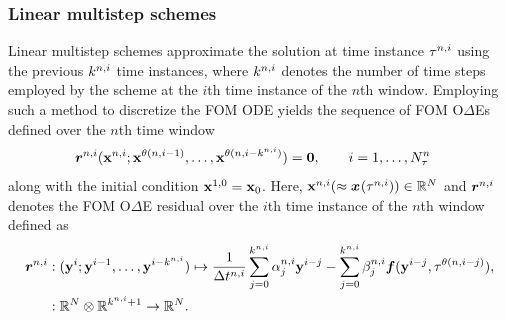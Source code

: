 \subsubsection{Linear multistep schemes}
Linear multistep schemes approximate the solution at time instance $\tau^{n,i}$ using the previous $k^{n,i}$ time instances, where $k^{n,i}$ denotes the number of time steps employed by the scheme at the $i$th time instance of the $n$th window. 
Employing such a method to discretize the FOM ODE yields the sequence of FOM
O$\Delta$Es defined over the $n$th time window
\begin{align*}
&\boldsymbol r_{}^{n,i} ({\mathbf{x}}^{n,i};{\mathbf{x}}^{\theta(n,i-1)},\ldots,{\mathbf{x}}^{\theta(n,i-k^{n,i})}) = \boldsymbol 0, \qquad i=1,\ldots,N_{\tau}^{n}
\end{align*}
along with the initial condition ${\mathbf{x}}^{1,0} = {{\mathbf{x}}_0}$.
Here, ${\mathbf{x}}^{n,i} (\approx
{\boldsymbol x}^{}(\tau^{n,i}))
\in \mathbb{R}^{N}$ and $\boldsymbol r_{}^{n,i}$ denotes the FOM O$\Delta$E
residual over the $i$th time instance of the $n$th window  
defined as
\begin{align*}
\boldsymbol r_{}^{n,i} &: (\mathbf{y}^{i};\mathbf{y}^{i-1},\ldots,\mathbf{y}^{i-k^{n,i}}) \mapsto  \frac{1}{\Delta t^{n,i}} \sum_{j=0}^{k^{n,i}} \alpha^{n,i}_j \mathbf{y}^{i-j} -  \sum_{j=0}^{k^{n,i}} \beta^{n,i}_j \boldsymbol f(\mathbf{y}^{i-j},\tau^{\theta(n,i-j)}), \\
               &: \mathbb{R}^{N} \otimes \mathbb{R}^{k^{n,i}+1} \rightarrow \mathbb{R}^{N}. 
\end{align*}
